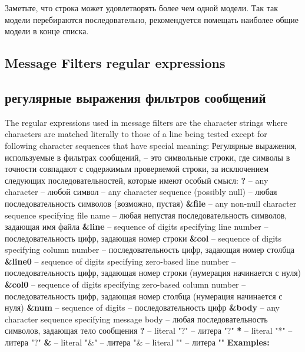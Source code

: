 Заметьте, что строка может удовлетворять более чем одной модели. Так так модели
перебираются последовательно, рекомендуется помещать наиболее общие модели в 
конце списка.
\fi
\ifenglish
\subsection{Message Filters regular expressions}
\else
\subsection{регулярные выражения фильтров сообщений}
\fi
{}

\ifenglish
The regular expressions used in message filters are the character strings
where characters are matched literally to those of a line being tested
except for following character sequences that have special meaning:
\else
Регулярные выражения, используемые в фильтрах сообщений, -- это символьные 
строки, где символы в точности совпадают с содержимым проверяемой строки,
за исключением следующих последовательностей, которые имеют особый смысл:
\fi
{\bf ?} \ifenglish
        -- any character
        \else
        -- любой символ
        \fi
{\bf *} \ifenglish
        -- any character sequence (possibly null)
        \else
        -- любая последовательность символов (возможно, пустая)
        \fi
{\bf \&file} 
           \ifenglish
           -- any non-null character sequence specifying file name
           \else
            -- любая непустая последовательность символов, задающая имя файла
           \fi
{\bf \&line} \ifenglish
             -- sequence of digits specifying line number
             \else
             -- последовательность цифр, задающая номер строки
             \fi
{\bf \&col} \ifenglish
            -- sequence of digits specifying column number
            \else
            -- последовательность цифр, задающая номер столбца
            \fi
{\bf \&line0} 
            \ifenglish  
            -- sequence of digits specifying zero-based line number
            \else
             -- последовательность цифр, задающая номер строки (нумерация 
                 начинается с нуля)
            \fi
{\bf \&col0} \ifenglish
             -- sequence of digits specifying zero-based column number
             \else
              -- последовательность цифр, задающая номер столбца  (нумерация
                начинается с нуля)
             \fi
{\bf \&num} 
            \ifenglish
            -- sequence of digits
            \else
            -- последовательность цифр
            \fi
{\bf \&body} \ifenglish
             -- any character sequence specifying message body
             \else
             -- любая последовательность символов, задающая тело сообщения 
             \fi
{\bf \bs{}?} \ifenglish
             -- literal "?"
             \else
             -- литера "?"
             \fi
{\bf \bs{}*} \ifenglish
             -- literal "*"
             \else
             -- литера "?"
             \fi
{\bf \bs\&} \ifenglish
            -- literal "\bs\&"
            \else
            -- литера "\bs\&
            \fi
{\bf \bs\bs} \ifenglish
             -- literal "\bs"
             \else
             -- литера "\bs"
             \fi
{\bf Examples:}


